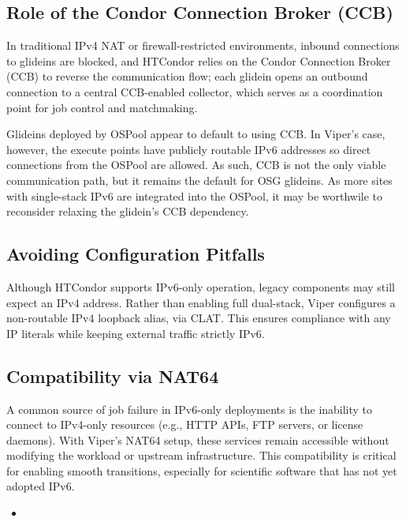 \documentclass[11pt]{article}
\begin{document}
\subsection{Role of the Condor Connection Broker (CCB)}

In traditional IPv4 NAT or firewall-restricted environments, inbound connections to glideins are blocked, and HTCondor relies on the Condor Connection Broker (CCB) to reverse the communication flow; each glidein opens an outbound connection to a central CCB-enabled collector, which serves as a coordination point for job control and matchmaking.

Glideins deployed by OSPool appear to default to using CCB. In Viper’s case, however, the execute points have publicly routable IPv6 addresses so direct connections from the OSPool are allowed. As such, CCB is not the only viable communication path, but it remains the default for OSG glideins. As more sites with single-stack IPv6 are integrated into the OSPool, it may be worthwile to reconsider relaxing the glidein's CCB dependency.

\subsection{Avoiding Configuration Pitfalls}

Although HTCondor supports IPv6-only operation, legacy components may still expect an IPv4 address. Rather than enabling full dual-stack, Viper configures a non-routable IPv4 loopback alias, via CLAT. This ensures compliance with any IP literals while keeping external traffic strictly IPv6.


\subsection{Compatibility via NAT64}

A common source of job failure in IPv6-only deployments is the inability to connect to IPv4-only resources (e.g., HTTP APIs, FTP servers, or license daemons). With Viper’s NAT64 setup, these services remain accessible without modifying the workload or upstream infrastructure. This compatibility is critical for enabling smooth transitions, especially for scientific software that has not yet adopted IPv6.


\begin{itemize}
\item \color{red}{DISCUSS SITUATIONS THAT ARE PATHOLOGICAL OR PERNICIOUS}
\end{itemize}
\end{document}
